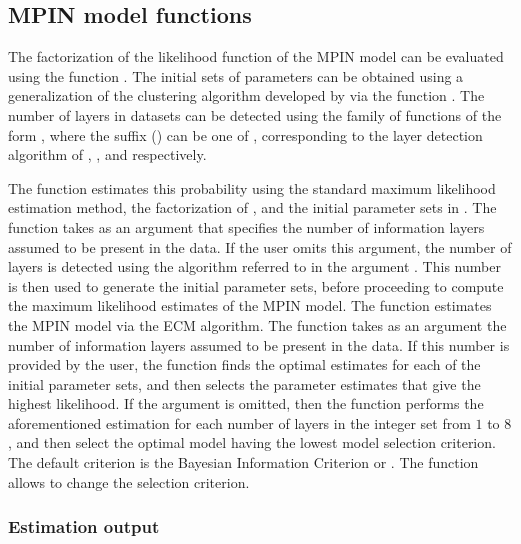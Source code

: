 \subsection{MPIN model functions}

The factorization of the likelihood function of the MPIN model can be evaluated using the function . The initial sets of parameters can be obtained using a generalization of the clustering algorithm developed by \cite{ersan2016multilayer} via the function . The number of layers in datasets can be detected using the family of functions of the form , where the suffix (\code{*}) can be one of , corresponding to the layer detection algorithm of \cite{ersan2016multilayer}, \cite{Ersan2022Identifying}, and \cite{ghachem2022maximum} respectively.

The function  estimates this probability using the standard maximum likelihood estimation method, the factorization of \cite{ersan2016multilayer}, and the initial parameter sets in \cite{Ersan2016unbiased}. The function  takes as an argument  that specifies the number of information layers assumed to be present in the data. If the user omits this argument, the number of layers is detected using the algorithm referred to in the argument . This number is then used to generate the initial parameter sets, before proceeding to compute the maximum likelihood estimates of the MPIN model. The function  estimates the MPIN model via the ECM algorithm. The function  takes as an argument the number of information layers  assumed to be present in the data. If this number is provided by the user, the function finds the optimal estimates for each of the initial parameter sets, and then selects the parameter estimates that give the highest likelihood. If the argument  is omitted, then the function performs the aforementioned estimation for each number of layers in the integer set from \(1\) to \(8\), and then select the optimal model having the lowest model selection criterion. The default criterion is the Bayesian Information Criterion or . The function  allows to change the selection criterion. 

\subsubsection{Estimation output}

